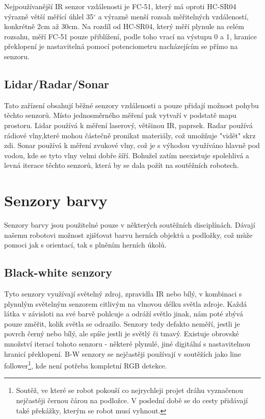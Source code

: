 Nejpoužívanější IR senzor vzdálenosti je FC-51, který má oproti HC-SR04 výrazně větší měřící úhlel 35$^{\circ}$ a výrazně menší rozsah měřitelných vzdáleností, konkrétně 2cm až 30cm.
Na rozdíl od HC-SR04, který měří plynule na celém rozsahu, měří FC-51 pouze přiblížení, podle toho vrací na výstupu 0 a 1, hranice překlopení je nastavitelná pomocí potenciometru nacházejícím se přímo na senzoru.

\subsection{Lidar/Radar/Sonar}
Tato zařízení obsahují běžné senzory vzdálenosti a pouze přidají možnost pohybu těchto senzorů. 
Místo jednosměrného měření pak vytvaří v podstatě mapu prostoru.
Lidar používá k měření laserový, většinou IR, paprsek.
Radar používá rádiové vlny,které mohou částečně pronikat materiály, což umožňuje "vidět" skrz zdi.
Sonar používá k měření zvukové vlny, což je s výhodou využíváno hlavně pod vodou, kde se tyto vlny velmi dobře šíří.
Bohužel zatím neexistuje spolehlivá a levná iterace těchto senzorů, která by se dala požít na soutěžních robotech.

\section{Senzory barvy}
Senzory barvy jsou použitelné pouze v některých soutěžních disciplínách.
Dávají našemu robotovi možnost zjišťovat barvu herních objektů a podložky, což může pomoci jak s orientací, tak s plněním herních úkolů.

\subsection{Black-white senzory}
Tyto senzory využívají světelný zdroj, zpravidla IR nebo bílý, v kombinaci s plynulým světelným senzorem citlivým na vlnovou délku světla zdroje.
Každá látka v závisloti na své barvě pohlcuje a odráží světlo jinak, nám poté zbývá pouze změřit, kolik světla se odrazilo.
Senzory tedy defakto neměří, jestli je povrch černý nebo bílý, ale spíše jestli je světlý či tmavý.
Existuje obrovské množství iterací tohoto senzoru - některé plynulé, jiné digitální s nastavitelnou hranicí překlopení.
B-W senzory se nejčastěji používají v soutěžích jako line follower\footnote{Soutěž, ve které se robot pokouší co nejrychleji projet dráhu vyznačenou nejčastěji černou čárou na podložce. V poslední době se do cesty přidávají také překážky, kterým se robot musí vyhnout.}, kde není potřeba kompletní RGB detekce.

